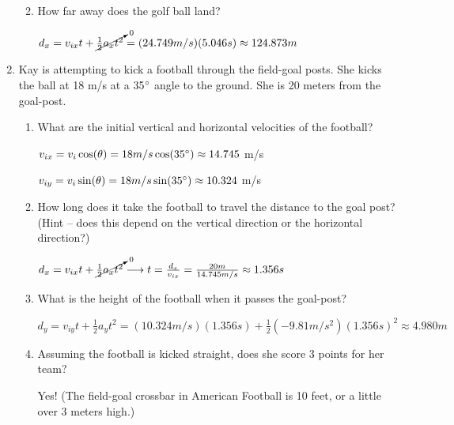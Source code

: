 \documentclass[letterpaper, 12pt]{article}
\begin{document}
\begin{enumerate}
\begin{enumerate}
	\vspace{0.1in}
	\item How far away does the golf ball land?
	
		\vspace{0.1in}
	\color{red}
		$d_x = v_{ix}t + \cancelto{0}{\frac{1}{2}a_xt^2} = (24.749 m/s)(5.046s) \approx 124.873 m$
	\color{black}
	
\end{enumerate}
\pagebreak
\item Kay is attempting to kick a football through the field-goal posts.  She kicks the ball at 18 m/s at a 35$\degree$ angle to the ground.  She is 20 meters from the goal-post.
\begin{enumerate}
	\item What are the initial vertical and horizontal velocities of the football?
	
	\vspace{0.1in}
\color{red}
	$ v_{ix} = v_i \cos (\theta) = 18 m/s \cos (35 \degree )  \approx  14.745$  m/s
	
	$ v_{iy} = v_i \sin (\theta) = 18 m/s  \sin (35 \degree )  \approx 10.324$  m/s

\color{black}

	\item How long does it take the football to travel the distance to the goal post?  (Hint – does this depend on the vertical direction or the horizontal direction?)
	
		\vspace{0.1in}
	\color{red}
		$d_x = v_{ix}t + \cancelto{0}{\frac{1}{2}a_xt^2} \longrightarrow t = \frac{d_x}{v_{ix}} = \frac{20 m}{14.745 m/s} \approx 1.356 s$
	\color{black}
	
		\vspace{0.1in}
	\item What is the height of the football when it passes the goal-post?

	\vspace{0.1in}
	\color{red}
	$d_y = v_{iy}t + \frac{1}{2}a_yt^2 = (10.324 m/s)(1.356 s) + \frac{1}{2}(-9.81 m/s^2)(1.356 s)^2 \approx 4.980 m $	
	\color{black}

	\vspace{0.1in}
	\item Assuming the football is kicked straight, does she score 3 points for her team?
	
		\vspace{0.1in}
	\color{red}
	Yes! (The field-goal crossbar in American Football is 10 feet, or a little over 3 meters high.)
	\color{black}
\end{enumerate}



\end{enumerate}
\end{document}
